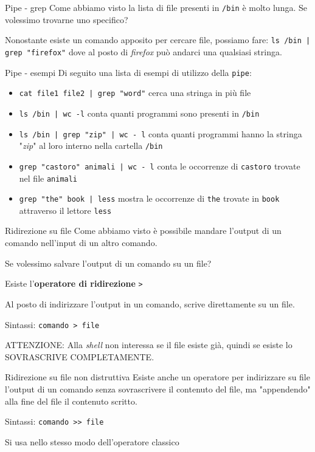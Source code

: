 \documentclass{beamer}
\begin{document}
\begin{frame}{Pipe - grep}
  Come abbiamo visto la lista di file presenti in \texttt{/bin} è molto lunga.
  Se volessimo trovarne uno specifico?\pause \bigskip

  Nonostante esiste un comando apposito per cercare file, possiamo fare:
  \texttt{ls /bin | grep "firefox"} dove al posto di \textit{firefox} può 
  andarci una qualsiasi stringa.
\end{frame}

\begin{frame}{Pipe - esempi}
  Di seguito una lista di esempi di utilizzo della \texttt{pipe}:
  \begin{itemize}
    \item \texttt{cat file1 file2 | grep "word"} cerca una stringa in più file
    \item \texttt{ls /bin | wc -l} conta quanti programmi sono presenti in 
      \texttt{/bin}
    \item \texttt{ls /bin | grep "zip" | wc - l} conta quanti programmi hanno
      la stringa "\textit{zip}" al loro interno nella cartella \texttt{/bin}
    \item \texttt{grep "castoro" animali | wc - l} conta le occorrenze di 
      \texttt{castoro} trovate nel file \texttt{animali}
    \item \texttt{grep "the" book | less} mostra le occorrenze di \texttt{the} 
      trovate in \texttt{book} attraverso il lettore \texttt{less}
  \end{itemize}
\end{frame}

\begin{frame}{Ridirezione su file}
  Come abbiamo visto è possibile mandare l'output di un comando nell'input di
  un altro comando.\bigskip

  Se volessimo salvare l'output di un comando su un file?\pause

  Esiste l'\textbf{operatore di ridirezione} \texttt{>}\bigskip

  Al posto di indirizzare l'output in un comando, scrive direttamente su un
  file.\bigskip

  Sintassi: \texttt{comando > file}\bigskip

  ATTENZIONE: Alla \textit{shell} non interessa se il file esiste già, quindi se 
  esiste lo SOVRASCRIVE COMPLETAMENTE.
\end{frame}

\begin{frame}{Ridirezione su file non distruttiva}
  Esiste anche un operatore per indirizzare su file l'output di un comando senza 
  sovrascrivere il contenuto del file, ma "appendendo" alla fine del file il
  contenuto scritto.\bigskip

  Sintassi: \texttt{comando >> file}\bigskip

  Si usa nello stesso modo dell'operatore classico\bigskip
\end{frame}
\end{document}
